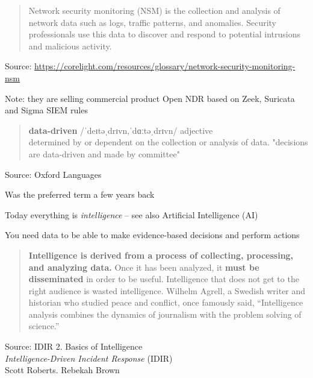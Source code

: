 \documentclass[Screen16to9,17pt]{foils}
\begin{document}


\begin{quote}
Network security monitoring (NSM) is the collection and analysis of network data such as logs, traffic patterns, and anomalies. Security professionals use this data to discover and respond to potential intrusions and malicious activity.

\end{quote}
Source: \url{https://corelight.com/resources/glossary/network-security-monitoring-nsm}

\begin{list2}
\item Note: they are selling commercial product Open NDR based on Zeek, Suricata and Sigma SIEM rules
\end{list2}



\begin{quote}
{\large\bf  data-driven} /ˈdeɪtəˌdrɪvn,ˈdɑːtəˌdrɪvn/
adjective\\
determined by or dependent on the collection or analysis of data.
"decisions are data-driven and made by committee"
\end{quote}
Source:  Oxford Languages

\begin{list2}
\item Was the preferred term a few years back
\item Today everything is \emph{intelligence} -- see also Artificial Intelligence (AI)
\item You need data to be able to make evidence-based decisions and perform actions
\end{list2}



\begin{quote}{\bf
Intelligence is derived from a process of collecting, processing, and analyzing data.}
Once it has been analyzed, it {\bf must be disseminated} in order to be useful. Intelligence
that does not get to the right audience is wasted intelligence. Wilhelm Agrell, a Swedish writer and historian who studied peace and conflict, once famously said, “Intelligence analysis combines the dynamics of journalism with the problem solving of science.”
\end{quote}
Source:  IDIR 2. Basics of Intelligence\\
\emph{Intelligence-Driven Incident Response} (IDIR)\\
 Scott Roberts. Rebekah Brown
\end{document}
